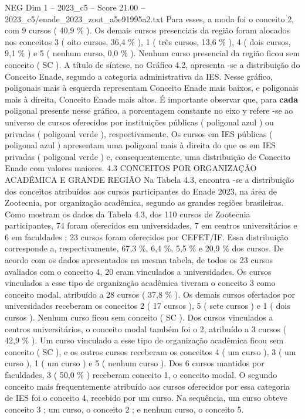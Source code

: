 \begin{textsample}{NEG Dim 1 – 2023\_c5 – Score 21.00 – 2023\_c5/enade\_2023\_zoot\_a5e91995a2.txt}
Para esses, a moda foi o conceito 2, com 9 cursos ( 40,9 \% ).
Os demais cursos presenciais da região foram alocados nos conceitos 3 ( oito cursos, 36,4 \% ), 1 ( três cursos, 13,6 \% ), 4 ( dois cursos, 9,1 \% ) e 5 ( nenhum curso, 0,0 \% ).
Nenhum curso presencial da região ficou sem conceito ( SC ).
A título de síntese, no Gráfico 4.2, apresenta -se a distribuição do Conceito Enade, segundo a categoria administrativa da IES.
Nesse gráfico, poligonais mais à esquerda representam Conceito Enade mais baixos, e poligonais mais à direita, Conceito Enade mais altos.
É importante observar que, para \textbf{cada} poligonal presente nesse gráfico, a porcentagem constante no eixo y refere -se ao universo de cursos oferecidos por instituições públicas ( poligonal azul ) ou privadas ( poligonal verde ), respectivamente.
Os cursos em IES públicas ( poligonal azul ) apresentam uma poligonal mais à direita do que os em IES privadas ( poligonal verde ) e, consequentemente, uma distribuição de Conceito Enade com valores maiores. 4.3 CONCEITOS POR ORGANIZAÇÃO ACADÊMICA E GRANDE REGIÃO Na Tabela 4.3, encontra -se a distribuição dos conceitos atribuídos aos cursos participantes do Enade 2023, na área de Zootecnia, por organização acadêmica, segundo as grandes regiões brasileiras.
Como mostram os dados da Tabela 4.3, dos 110 cursos de Zootecnia participantes, 74 foram oferecidos em universidades, 7 em centros universitários e 6 em faculdades ; 23 cursos foram oferecidos por CEFET/IF.
Essa distribuição corresponde a, respectivamente, 67,3 \%, 6,4 \%, 5,5 \% e 20,9 \% dos cursos.
De acordo com os dados apresentados na mesma tabela, de todos os 23 cursos avaliados com o conceito 4, 20 eram vinculados a universidades.
Os cursos vinculados a esse tipo de organização acadêmica tiveram o conceito 3 como conceito modal, atribuído a 28 cursos ( 37,8 \% ).
Os demais cursos ofertados por universidades receberam os conceitos 2 ( 17 cursos ), 5 ( sete cursos ) e 1 ( dois cursos ).
Nenhum curso ficou sem conceito ( SC ).
Dos cursos vinculados a centros universitários, o conceito modal também foi o 2, atribuído a 3 cursos ( 42,9 \% ).
Um curso vinculado a esse tipo de organização acadêmica ficou sem conceito ( SC ), e os outros cursos receberam os conceitos 4 ( um curso ), 3 ( um curso ), 1 ( um curso ) e 5 ( nenhum curso ).
Dos 6 cursos mantidos por faculdades, 3 ( 50,0 \% ) receberam conceito 1, o conceito modal.
O segundo conceito mais frequentemente atribuído aos cursos oferecidos por essa categoria de IES foi o conceito 4, recebido por um curso.
Na sequência, um curso obteve conceito 3 ; um curso, o conceito 2 ; e nenhum curso, o conceito 5.

\end{textsample}
